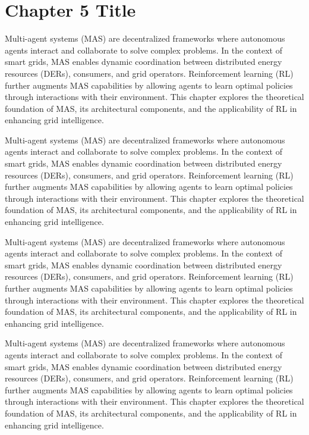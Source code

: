 \chapter{Chapter 5 Title}


Multi-agent systems (MAS) are decentralized frameworks where autonomous agents interact and collaborate to solve complex problems. 
In the context of smart grids, MAS enables dynamic coordination between distributed energy resources (DERs), consumers, and grid operators. 
Reinforcement learning (RL) further augments MAS capabilities by allowing agents to learn optimal policies through interactions with their environment. 
This chapter explores the theoretical foundation of MAS, its architectural components, and the applicability of RL in enhancing grid intelligence.

Multi-agent systems (MAS) are decentralized frameworks where autonomous agents interact and collaborate to solve complex problems. 
In the context of smart grids, MAS enables dynamic coordination between distributed energy resources (DERs), consumers, and grid operators. 
Reinforcement learning (RL) further augments MAS capabilities by allowing agents to learn optimal policies through interactions with their environment. 
This chapter explores the theoretical foundation of MAS, its architectural components, and the applicability of RL in enhancing grid intelligence.

Multi-agent systems (MAS) are decentralized frameworks where autonomous agents interact and collaborate to solve complex problems. 
In the context of smart grids, MAS enables dynamic coordination between distributed energy resources (DERs), consumers, and grid operators. 
Reinforcement learning (RL) further augments MAS capabilities by allowing agents to learn optimal policies through interactions with their environment. 
This chapter explores the theoretical foundation of MAS, its architectural components, and the applicability of RL in enhancing grid intelligence.

Multi-agent systems (MAS) are decentralized frameworks where autonomous agents interact and collaborate to solve complex problems. 
In the context of smart grids, MAS enables dynamic coordination between distributed energy resources (DERs), consumers, and grid operators. 
Reinforcement learning (RL) further augments MAS capabilities by allowing agents to learn optimal policies through interactions with their environment. 
This chapter explores the theoretical foundation of MAS, its architectural components, and the applicability of RL in enhancing grid intelligence.

